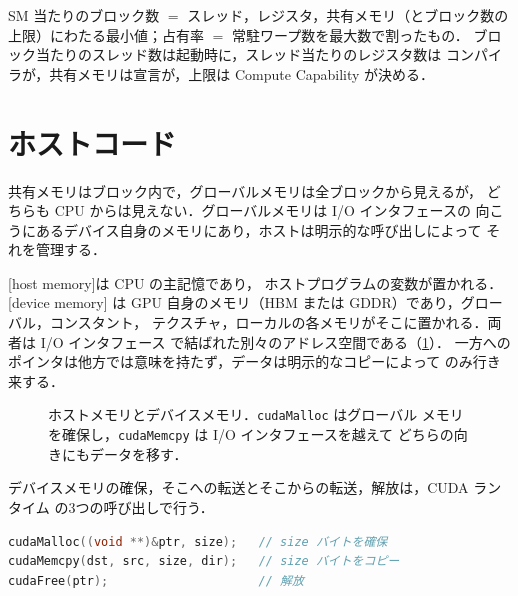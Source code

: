 \documentclass[../main.tex]{subfiles}
\begin{document}
\begin{keypoint}
  SM 当たりのブロック数 $=$ スレッド，レジスタ，共有メモリ（とブロック数の
  上限）にわたる最小値；占有率 $=$ 常駐ワープ数を最大数で割ったもの．
  ブロック当たりのスレッド数は起動時に，スレッド当たりのレジスタ数は
  コンパイラが，共有メモリは宣言が，上限は Compute Capability が決める．
\end{keypoint}

\section{ホストコード}
\label{sec:l03-host}

共有メモリはブロック内で，グローバルメモリは全ブロックから見えるが，
どちらも CPU からは見えない．グローバルメモリは I/O インタフェースの
向こうにあるデバイス自身のメモリにあり，ホストは明示的な呼び出しによって
それを管理する．

\begin{definition}
  [host memory]は CPU の主記憶であり，
  ホストプログラムの変数が置かれる．[device memory]
  は GPU 自身のメモリ（HBM または GDDR）であり，グローバル，コンスタント，
  テクスチャ，ローカルの各メモリがそこに置かれる．両者は I/O インタフェース
  で結ばれた別々のアドレス空間である（\cref{fig:l03-host-device}）．
  一方へのポインタは他方では意味を持たず，データは明示的なコピーによって
  のみ行き来する．
\end{definition}

\begin{figure}[tb]
  \centering
  
  \caption{ホストメモリとデバイスメモリ．\texttt{cudaMalloc} はグローバル
    メモリを確保し，\texttt{cudaMemcpy} は I/O インタフェースを越えて
    どちらの向きにもデータを移す．}
  \label{fig:l03-host-device}
\end{figure}

デバイスメモリの確保，そこへの転送とそこからの転送，解放は，CUDA ランタイム
の3つの呼び出しで行う．
\begin{lstlisting}[language=C++, numbers=none]
cudaMalloc((void **)&ptr, size);   // size バイトを確保
cudaMemcpy(dst, src, size, dir);   // size バイトをコピー
cudaFree(ptr);                     // 解放
\end{lstlisting}
\end{document}
